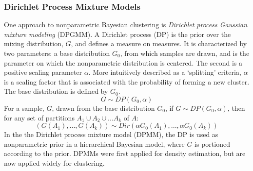 






\subsubsection{Dirichlet Process Mixture Models}
One approach to nonparametric Bayesian clustering is \emph{Dirichlet process Gaussian mixture modeling} (DPGMM). A Dirichlet process (DP) is the prior over the mixing distribution, $G$, and defines a measure on measures. It is characterized by two parameters: a base distribution $G_0$, from which samples are drawn, and is the parameter on which the nonparametric distribution is centered.  The second is a positive scaling parameter $\alpha$.  More intuitively described as a `splitting' criteria, $\alpha$ is a scaling factor that is associated with the probability of forming a new cluster.  The base distribution is defined by $G_0$.
$$G \sim DP(G_0,\alpha)$$
For a sample, $G$, drawn from the base distribution $G_0$, if $G \sim DP(G_0,\alpha)$, then for any set of partitions $A_1 \cup A_2 \cup ... A_k$ of $A$:
$$(G(A_1),...,G(A_k)) \sim Dir(\alpha G_0(A_1),...,\alpha G_0(A_k))$$
In the the Dirichlet process mixture model (DPMM), the DP is used as nonparametric prior in a hierarchical Bayesian model, where $G$ is portioned according to the prior. DPMMs were first applied for density estimation, but are now applied widely for clustering.

